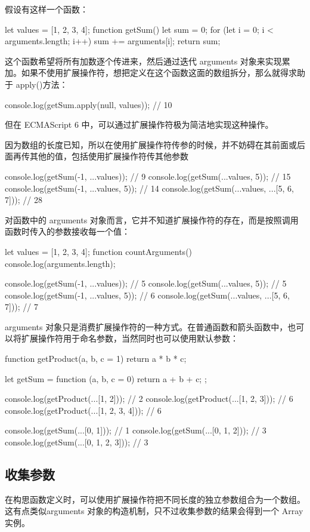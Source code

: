 假设有这样一个函数：
\begin{js}
let values = [1, 2, 3, 4];
function getSum() {
    let sum = 0;
    for (let i = 0; i < arguments.length; i++) {
    sum += arguments[i];
    }
    return sum;
}
\end{js}

这个函数希望将所有加数逐个传进来，然后通过迭代 arguments 对象来实现累加。如果不使用扩展操作符，想把定义在这个函数这面的数组拆分，那么就得求助于 apply()方法：
\begin{js}
console.log(getSum.apply(null, values)); // 10
\end{js}
但在 ECMAScript 6 中，可以通过扩展操作符极为简洁地实现这种操作。

因为数组的长度已知，所以在使用扩展操作符传参的时候，并不妨碍在其前面或后面再传其他的值，包括使用扩展操作符传其他参数
\begin{js}
console.log(getSum(-1, ...values)); // 9
console.log(getSum(...values, 5)); // 15
console.log(getSum(-1, ...values, 5)); // 14
console.log(getSum(...values, ...[5, 6, 7])); // 28
\end{js}

对函数中的 arguments 对象而言，它并不知道扩展操作符的存在，而是按照调用函数时传入的参数接收每一个值：
\begin{js}
let values = [1, 2, 3, 4];
function countArguments() {
  console.log(arguments.length);
}

console.log(getSum(-1, ...values)); // 5
console.log(getSum(...values, 5)); // 5
console.log(getSum(-1, ...values, 5)); // 6
console.log(getSum(...values, ...[5, 6, 7])); // 7
\end{js}

arguments 对象只是消费扩展操作符的一种方式。在普通函数和箭头函数中，也可以将扩展操作符用于命名参数，当然同时也可以使用默认参数：
\begin{js}
function getProduct(a, b, c = 1) {
  return a * b * c;
}

let getSum = function (a, b, c = 0) {
  return a + b + c;
};

console.log(getProduct(...[1, 2])); // 2
console.log(getProduct(...[1, 2, 3])); // 6
console.log(getProduct(...[1, 2, 3, 4])); // 6

console.log(getSum(...[0, 1])); // 1
console.log(getSum(...[0, 1, 2])); // 3
console.log(getSum(...[0, 1, 2, 3])); // 3
\end{js}
\subsection{收集参数}
在构思函数定义时，可以使用扩展操作符把不同长度的独立参数组合为一个数组。这有点类似arguments 对象的构造机制，只不过收集参数的结果会得到一个 Array 实例。

